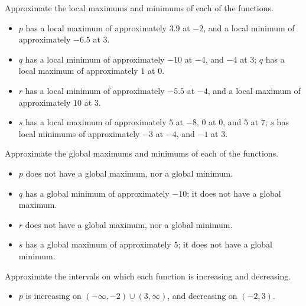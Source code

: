 \begin{exercises}
\begin{problem}
\begin{subproblem}
\begin{shortsolution}
\begin{itemize}
        \end{itemize}
    \end{shortsolution}
\end{subproblem}
\begin{subproblem}
Approximate the local maximums and minimums of each of the functions.
    \begin{shortsolution}
     \begin{itemize}
      \item $p$ has a local maximum of approximately $3.9$ at $-2$, and a local minimum of approximately $-6.5$ at $3$.
      \item $q$ has a local minimum of approximately $-10$ at $-4$, and $-4$ at $3$; $q$ has a local maximum of approximately $1$ at $0$.
      \item $r$ has a local minimum of approximately $-5.5$ at $-4$, and a local maximum of approximately $10$ at $3$.
      \item $s$ has a local maximum of approximately $5$ at $-8$, $0$ at $0$, and $5$ at  $7$; $s$ has local minimums 
       of approximately $-3$ at $-4$, and $-1$ at $3$.
     \end{itemize}
    \end{shortsolution}
\end{subproblem}
\begin{subproblem}
Approximate the global maximums and minimums of each of the functions.
    \begin{shortsolution}
        \begin{itemize}
         \item $p$ does not have a global maximum, nor a global minimum.
         \item $q$ has a global minimum of approximately $-10$; it does not have a global maximum.
         \item $r$ does not have a global maximum, nor a global minimum.
         \item $s$ has a global maximum of approximately $5$; it does not have a global minimum.
        \end{itemize}
    \end{shortsolution}
\end{subproblem}
\begin{subproblem}
Approximate the intervals on which each function is increasing and decreasing.
    \begin{shortsolution}
     \begin{itemize}
      \item $p$ is increasing on $(-\infty,-2)\cup (3,\infty)$, and decreasing on $(-2,3)$.

\end{itemize}
\end{shortsolution}
\end{subproblem}
\end{problem}
\end{exercises}
